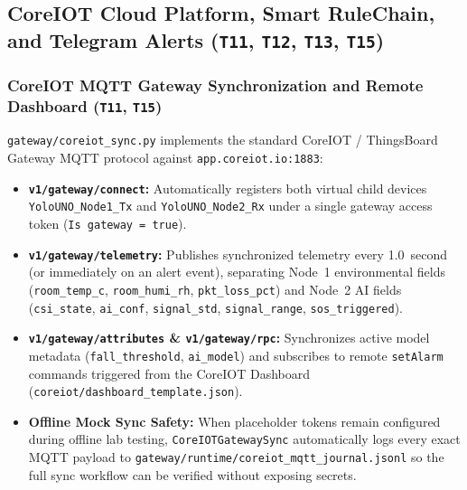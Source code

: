 \documentclass{hcmut-report}
\begin{document}
\subsection[CoreIOT Cloud Platform (\texttt{T11}, \texttt{T12}, \texttt{T13}, \texttt{T15})]{CoreIOT Cloud Platform, Smart RuleChain, and Telegram Alerts (\texttt{T11}, \texttt{T12}, \texttt{T13}, \texttt{T15})}

\subsubsection{CoreIOT MQTT Gateway Synchronization and Remote Dashboard (\texttt{T11}, \texttt{T15})}
\texttt{gateway/coreiot\_sync.py} implements the standard CoreIOT / ThingsBoard Gateway MQTT protocol against \texttt{app.coreiot.io:1883}:
\begin{itemize}
  \item \textbf{\texttt{v1/gateway/connect}:} Automatically registers both virtual child devices \texttt{YoloUNO\_Node1\_Tx} and \texttt{YoloUNO\_Node2\_Rx} under a single gateway access token (\texttt{Is gateway = true}).
  \item \textbf{\texttt{v1/gateway/telemetry}:} Publishes synchronized telemetry every 1.0~second (or immediately on an alert event), separating Node~1 environmental fields (\texttt{room\_temp\_c}, \texttt{room\_humi\_rh}, \texttt{pkt\_loss\_pct}) and Node~2 AI fields (\texttt{csi\_state}, \texttt{ai\_conf}, \texttt{signal\_std}, \texttt{signal\_range}, \texttt{sos\_triggered}).
  \item \textbf{\texttt{v1/gateway/attributes} \& \texttt{v1/gateway/rpc}:} Synchronizes active model metadata (\texttt{fall\_threshold}, \texttt{ai\_model}) and subscribes to remote \texttt{setAlarm} commands triggered from the CoreIOT Dashboard (\texttt{coreiot/dashboard\_template.json}).
  \item \textbf{Offline Mock Sync Safety:} When placeholder tokens remain configured during offline lab testing, \texttt{CoreIOTGatewaySync} automatically logs every exact MQTT payload to \texttt{gateway/runtime/coreiot\_mqtt\_journal.jsonl} so the full sync workflow can be verified without exposing secrets.
\end{itemize}
\end{document}
